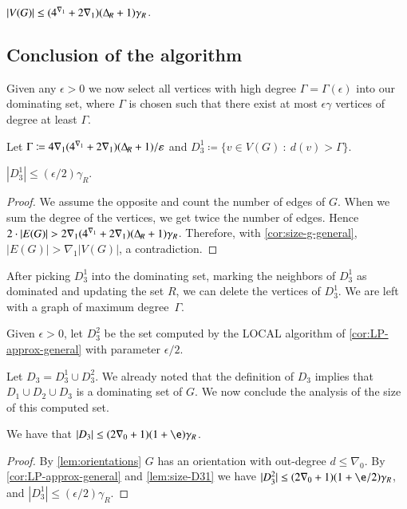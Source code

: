 \begin{corollary}\label{cor:size-g-general}
  $|V(G)| \le (4^{\nabla_1}+2\nabla_1)(\Delta_{\hspace{-1pt}R}+1)\gamma_R$.
\end{corollary}


\subsection{Conclusion of the algorithm}


Given any $\epsilon>0$ we now select all vertices with high degree
$\Gamma=\Gamma(\epsilon)$ into our
dominating set, where $\Gamma$ is chosen such that there exist at
most $\epsilon\gamma$ vertices of degree at least $\Gamma$.

\begin{tcolorbox}[colback=red!5!white,colframe=red!50!black]
  Let $\Gamma\coloneqq 4\nabla_1(4^{\nabla_1}+2\nabla_1)(\Delta_{\hspace{-1pt}R}+1)/\varepsilon$ \quad and \quad
  $D_3^1\coloneqq \{v\in V(G) ~:~ d(v)>\Gamma\}$.
\end{tcolorbox}

\begin{lemma}\label{lem:size-D31}
  $|D_3^1|\le (\epsilon/2)\gamma_R$.
\end{lemma}
\begin{proof}
  We assume the opposite and count the number of edges of $G$.
  When we sum the degree of the vertices, we get twice the number of
  edges. Hence $2\cdot |E(G)| > 2\nabla_1(4^{\nabla_1}+2\nabla_1)(\Delta_{\hspace{-1pt}R}+1)\gamma_R$.
  Therefore, with \cref{cor:size-g-general},
  $|E(G)|> \nabla_1|V(G)|$, a contradiction.
\end{proof}

After picking $D_3^1$ into the dominating set, marking the neighbors of
$D_3^1$ as dominated and updating the set $R$, we can delete the
vertices of $D_3^1$. We are left with a graph of maximum degree~$\Gamma$.

\begin{tcolorbox}[colback=red!5!white,colframe=red!50!black]
  Given $\epsilon>0$, let $D_3^2$ be the set computed by the LOCAL algorithm of \cref{cor:LP-approx-general} with parameter $\epsilon/2$.
\end{tcolorbox}

Let $D_3=D_3^1 \cup D_3^2$. We already noted that the definition of $D_3$ implies that
$D_1\cup D_2\cup D_3$ is a dominating set of $G$. We now conclude the
analysis of the size of this computed set.

\begin{lemma}\label{lem:D3-LP}
  We have that $|D_3| \le (2\nabla_0+1)(1+\e)\gamma_R$.
\end{lemma}
\begin{proof}
By \cref{lem:orientations} $G$ has an orientation with
out-degree $d\leq \nabla_0$. By
\cref{cor:LP-approx-general} and \cref{lem:size-D31} we have
  $|D_3^2|\leq (2\nabla_0+1)(1+\e/2)\gamma_R$, and $|D_3^1|\le (\epsilon/2)\gamma_R$.
\end{proof}

